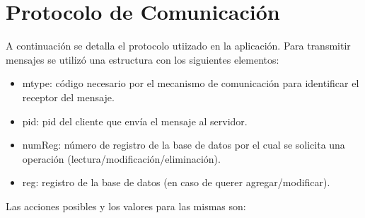 \documentclass[a4paper,10pt]{article}
\begin{document}
	\section{Protocolo de Comunicaci\'on}
	A continuaci\'on se detalla el protocolo utiizado en la aplicaci\'on.
	Para transmitir mensajes se utiliz\'o una estructura con los siguientes elementos:
	\begin{itemize}
		\item mtype: c\'odigo necesario por el mecanismo de comunicaci\'on para identificar el receptor del mensaje.	
		\item pid: pid del cliente que env\'ia el mensaje al servidor.
		\item numReg: n\'umero de registro de la base de datos por el cual se solicita una operaci\'on (lectura/modificaci\'on/eliminaci\'on).
		\item reg: registro de la base de datos (en caso de querer agregar/modificar).
	\end{itemize}	
	Las acciones posibles y los valores para las mismas son: 
\end{document}
